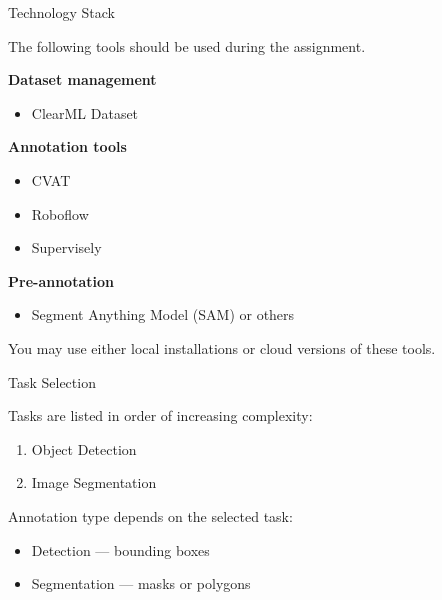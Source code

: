 \documentclass[aspectratio=169]{beamer}
\begin{document}
\begin{frame}[t]{Technology Stack}

The following tools should be used during the assignment.

\textbf{Dataset management}

\begin{itemize}
\item ClearML Dataset
\end{itemize}

\textbf{Annotation tools}

\begin{itemize}
\item CVAT
\item Roboflow
\item Supervisely
\end{itemize}

\textbf{Pre-annotation}

\begin{itemize}
\item Segment Anything Model (SAM) or others
\end{itemize}

You may use either local installations or cloud versions of these tools.

\end{frame}

\begin{frame}[t]{Task Selection}

Tasks are listed in order of increasing complexity:

\begin{enumerate}
\item Object Detection
\item Image Segmentation
\end{enumerate}

Annotation type depends on the selected task:

\begin{itemize}
\item Detection — bounding boxes
\item Segmentation — masks or polygons
\end{itemize}

\end{frame}
\end{document}
